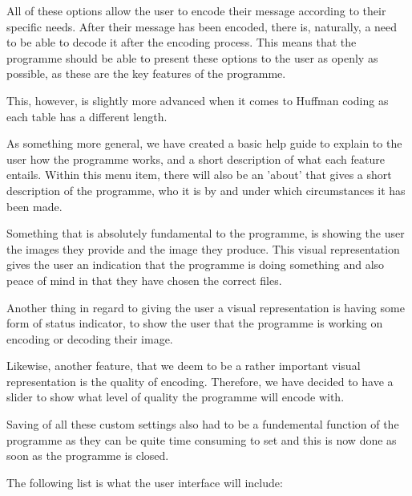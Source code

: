 All of these options allow the user to encode their message according to their specific needs.
After their message has been encoded, there is, naturally, a need to be able to decode it after the encoding process.
This means that the programme should be able to present these options to the user as openly as possible, as these are the key features of the programme.

This, however, is slightly more advanced when it comes to Huffman coding as each table has a different length.

As something more general, we have created a basic help guide to explain to the user how the programme works, and a short description of what each feature entails.
Within this menu item, there will also be an 'about' that gives a short description of the programme, who it is by and under which circumstances it has been made.

Something that is absolutely fundamental to the programme, is showing the user the images they provide and the image they produce.
This visual representation gives the user an indication that the programme is doing something and also peace of mind in that they have chosen the correct files.

Another thing in regard to giving the user a visual representation is having some form of status indicator, to show the user that the programme is working on encoding or decoding their image.

Likewise, another feature, that we deem to be a rather important visual representation is the quality of encoding.
Therefore, we have decided to have a slider to show what level of quality the programme will encode with.

Saving of all these custom settings also had to be a fundemental function of the programme as they can be quite time consuming to set and this is now done as soon as the programme is closed.

The following list is what the user interface will include:

